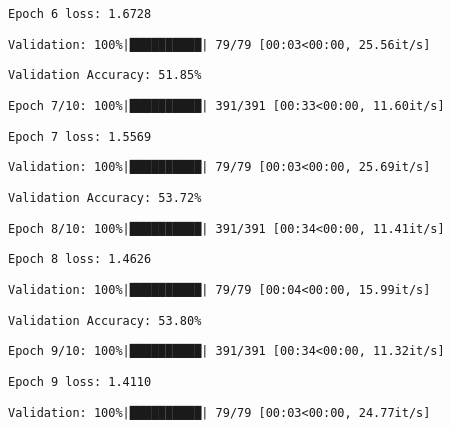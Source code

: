 \documentclass[
  letterpaper,
  DIV=11,
  numbers=noendperiod]{scrreprt}
\begin{document}
\begin{verbatim}
Epoch 6 loss: 1.6728
\end{verbatim}

\begin{verbatim}
Validation: 100%|██████████| 79/79 [00:03<00:00, 25.56it/s]
\end{verbatim}

\begin{verbatim}
Validation Accuracy: 51.85%
\end{verbatim}

\begin{verbatim}
Epoch 7/10: 100%|██████████| 391/391 [00:33<00:00, 11.60it/s]
\end{verbatim}

\begin{verbatim}
Epoch 7 loss: 1.5569
\end{verbatim}

\begin{verbatim}
Validation: 100%|██████████| 79/79 [00:03<00:00, 25.69it/s]
\end{verbatim}

\begin{verbatim}
Validation Accuracy: 53.72%
\end{verbatim}

\begin{verbatim}
Epoch 8/10: 100%|██████████| 391/391 [00:34<00:00, 11.41it/s]
\end{verbatim}

\begin{verbatim}
Epoch 8 loss: 1.4626
\end{verbatim}

\begin{verbatim}
Validation: 100%|██████████| 79/79 [00:04<00:00, 15.99it/s]
\end{verbatim}

\begin{verbatim}
Validation Accuracy: 53.80%
\end{verbatim}

\begin{verbatim}
Epoch 9/10: 100%|██████████| 391/391 [00:34<00:00, 11.32it/s]
\end{verbatim}

\begin{verbatim}
Epoch 9 loss: 1.4110
\end{verbatim}

\begin{verbatim}
Validation: 100%|██████████| 79/79 [00:03<00:00, 24.77it/s]
\end{verbatim}
\end{document}
